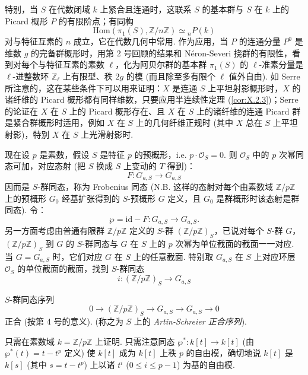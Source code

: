 特别，当 $S$ 在代数闭域 $k$ 上紧合且连通时，这联系 $S$ 的基本群与 $S$ 在 $k$ 上的 Picard 概形 $P$ 的有限阶点；有同构
\[
\mathrm{Hom}(\pi_1(S), \mathbb{Z}/n\mathbb{Z}) \simeq {}_n P(k)
\]
对与特征互素的 $n$ 成立，它在代数几何中常用. 作为应用，当 $P$ 的连通分量 $P^0$ 是维数 $g$ 的完备群概形时，用第 2 号回顾的结果和 Néron-Severi 挠群的有限性，看到对每个与特征互素的素数 $\ell$，化为阿贝尔群的基本群 $\pi_1(S)$ 的 $\ell$-准素分量是 $\ell$-进整数环 $\mathbb{Z}_\ell$ 上有限型、秩 $2g$ 的模 (而且除至多有限个 $\ell$ 值外自由). 如 Serre 所注意的，这在某些条件下可以用来证明：$X$ 是连通 $S$ 上平坦射影概形时，$X$ 的诸纤维的 Picard 概形都有同样维数，只要应用半连续性定理 (\cref{cor:X.2.3})；Serre 的论证在 $X$ 在 $S$ 上的 Picard 概形存在、且 $X$ 在 $S$ 上的诸纤维的连通 Picard 群是紧合群概形时适用，例如 $X$ 在 $S$ 上的几何纤维正规时 (其中 $X$ 总在 $S$ 上平坦射影)，特别 $X$ 在 $S$ 上光滑射影时.

现在设 $p$ 是素数，假设 $S$ 是特征 $p$ 的预概形，i.e. $p \cdot \mathcal{O}_S = 0$. 则 $\mathcal{O}_S$ 中的 $p$ 次幂同态可加，对应态射 (把 $S$ 换成 $S$ 上变动的 $T$ 得到)：
\[
F \colon G_{a,S} \longrightarrow G_{a,S}
\]
因而是 $S$-群同态，称为 Frobenius 同态 (N.B. 这样的态射对每个由素数域 $\mathbb{Z}/p\mathbb{Z}$ 上的预概形 $G_0$ 经基扩张得到的 $S$-预概形 $G$ 定义，且 $G_0$ 是群概形时该态射是群同态). 令：
\[
\wp = \mathrm{id} - F \colon G_{a,S} \longrightarrow G_{a,S}.
\]
另一方面考虑由普通有限群 $\mathbb{Z}/p\mathbb{Z}$ 定义的 $S$-群 $(\mathbb{Z}/p\mathbb{Z})_S$，已说对每个 $S$-群 $G$，$(\mathbb{Z}/p\mathbb{Z})_S$ 到 $G$ 的 $S$-群同态与 $G$ 在 $S$ 上的 $p$ 次幂为单位截面的截面一一对应. 当 $G = G_{a,S}$ 时，它们对应 $G$ 在 $S$ 上的任意截面. 特别取 $G_{a,S}$ 在 $S$ 上对应环层 $\mathcal{O}_S$ 的单位截面的截面，找到 $S$-群同态
\[
i \colon (\mathbb{Z}/p\mathbb{Z})_S \longrightarrow G_{a,S}
\]

\begin{proposition}\label{prop:XI.6.7}
$S$-群同态序列
\[
0 \longrightarrow (\mathbb{Z}/p\mathbb{Z})_S \longrightarrow G_{a,S} \longrightarrow G_{a,S} \longrightarrow 0
\]
正合 (按第 4 号的意义). (称之为 $S$ 上的 \emph{Artin-Schreier 正合序列}).
\end{proposition}

只需在素数域 $k = \mathbb{Z}/p\mathbb{Z}$ 上证明. 只需注意同态 $\wp^{*} \colon k[t] \to k[t]$ (由 $\wp^{*}(t) = t - t^p$ 定义) 使 $k[t]$ 成为 $k[t]$ 上秩 $p$ 的自由模，确切地说 $k[t]$ 是 $k[s]$ (其中 $s = t - t^p$) 上以诸 $t^i$ ($0 \leqslant i \leqslant p - 1$) 为基的自由模.

